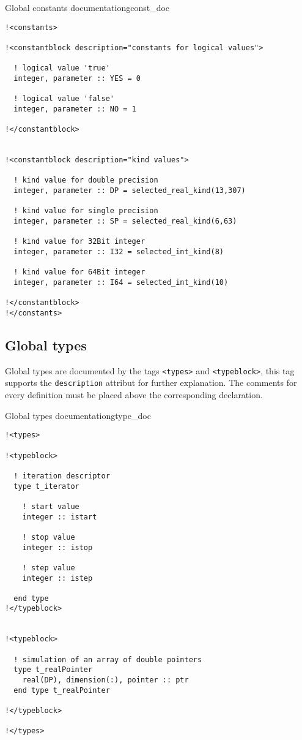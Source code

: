 \begin{code}{Global constants documentation}{gconst_doc}
\begin{verbatim}
!<constants>

!<constantblock description="constants for logical values">

  ! logical value 'true'
  integer, parameter :: YES = 0

  ! logical value 'false'
  integer, parameter :: NO = 1

!</constantblock>


!<constantblock description="kind values">

  ! kind value for double precision
  integer, parameter :: DP = selected_real_kind(13,307)

  ! kind value for single precision
  integer, parameter :: SP = selected_real_kind(6,63)

  ! kind value for 32Bit integer
  integer, parameter :: I32 = selected_int_kind(8)

  ! kind value for 64Bit integer
  integer, parameter :: I64 = selected_int_kind(10)

!</constantblock>
!</constants>
\end{verbatim}
\end{code}

\subsection{Global types}

Global types are documented by the tags \verb+<types>+ and 
\verb+<typeblock>+, this tag supports the \verb+description+ attribut
for further explanation. The comments for every definition must
be placed above the corresponding declaration.

\begin{code}{Global types documentation}{gtype_doc}
\begin{verbatim}
!<types>

!<typeblock>

  ! iteration descriptor
  type t_iterator

    ! start value
    integer :: istart

    ! stop value
    integer :: istop

    ! step value
    integer :: istep

  end type
!</typeblock>


!<typeblock>

  ! simulation of an array of double pointers
  type t_realPointer
    real(DP), dimension(:), pointer :: ptr
  end type t_realPointer

!</typeblock>

!</types>
\end{verbatim}
\end{code}

